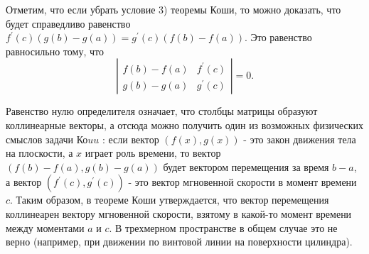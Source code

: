 Отметим, что если убрать условие 3) теоремы Коши, то можно доказать, что будет справедливо равенство $f^{\prime}(c)(g(b)-g(a))=g^{\prime}(c)(f(b)-f(a))$. Это равенство равносильно тому, что
$$
    \left|\begin{array}{ll}
        f(b)-f(a) & f^{\prime}(c) \\
        g(b)-g(a) & g^{\prime}(c)
    \end{array}\right|=0 .
$$

Равенство нулю определителя означает, что столбцы матрицы образуют коллинеарные векторы, а отсюда можно получить один из возможных физических смыслов задачи Ко$u u$ : если вектор $(f(x), g(x))$ - это закон движения тела на плоскости, а $x$ играет роль времени, то вектор $(f(b)-f(a), g(b)-g(a))$ будет вектором перемещения за время $b-a$, а вектор $\left(f^{\prime}(c), g^{\prime}(c)\right)$ - это вектор мгновенной скорости в момент времени $c$. Таким образом, в теореме Коши утверждается, что вектор перемещения коллинеарен вектору мгновенной скорости, взятому в какой-то момент времени между моментами $a$ и $c$. В трехмерном пространстве в общем случае это не верно (например, при движении по винтовой линии на поверхности цилиндра).
\newpage
